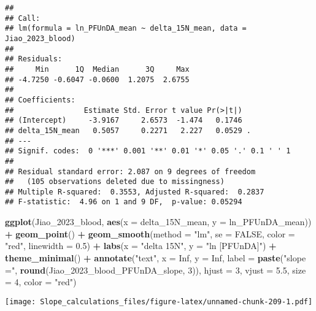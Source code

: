 \documentclass[
]{article}
\newenvironment{Shaded}{\begin{snugshade}}{\end{snugshade}}
\newcommand{\AttributeTok}[1]{\textcolor[rgb]{0.13,0.29,0.53}{#1}}
\newcommand{\ConstantTok}[1]{\textcolor[rgb]{0.56,0.35,0.01}{#1}}
\newcommand{\DecValTok}[1]{\textcolor[rgb]{0.00,0.00,0.81}{#1}}
\newcommand{\FloatTok}[1]{\textcolor[rgb]{0.00,0.00,0.81}{#1}}
\newcommand{\FunctionTok}[1]{\textcolor[rgb]{0.13,0.29,0.53}{\textbf{#1}}}
\newcommand{\NormalTok}[1]{#1}
\newcommand{\SpecialCharTok}[1]{\textcolor[rgb]{0.81,0.36,0.00}{\textbf{#1}}}
\newcommand{\StringTok}[1]{\textcolor[rgb]{0.31,0.60,0.02}{#1}}
\begin{document}
\begin{verbatim}
## 
## Call:
## lm(formula = ln_PFUnDA_mean ~ delta_15N_mean, data = Jiao_2023_blood)
## 
## Residuals:
##     Min      1Q  Median      3Q     Max 
## -4.7250 -0.6047 -0.0600  1.2075  2.6755 
## 
## Coefficients:
##                Estimate Std. Error t value Pr(>|t|)  
## (Intercept)     -3.9167     2.6573  -1.474   0.1746  
## delta_15N_mean   0.5057     0.2271   2.227   0.0529 .
## ---
## Signif. codes:  0 '***' 0.001 '**' 0.01 '*' 0.05 '.' 0.1 ' ' 1
## 
## Residual standard error: 2.087 on 9 degrees of freedom
##   (105 observations deleted due to missingness)
## Multiple R-squared:  0.3553, Adjusted R-squared:  0.2837 
## F-statistic:  4.96 on 1 and 9 DF,  p-value: 0.05294
\end{verbatim}

\begin{Shaded}
\begin{Highlighting}[]
\FunctionTok{ggplot}\NormalTok{(Jiao\_2023\_blood, }\FunctionTok{aes}\NormalTok{(}\AttributeTok{x =}\NormalTok{ delta\_15N\_mean, }\AttributeTok{y =}\NormalTok{ ln\_PFUnDA\_mean)) }\SpecialCharTok{+}
  \FunctionTok{geom\_point}\NormalTok{() }\SpecialCharTok{+}
  \FunctionTok{geom\_smooth}\NormalTok{(}\AttributeTok{method =} \StringTok{"lm"}\NormalTok{, }\AttributeTok{se =} \ConstantTok{FALSE}\NormalTok{, }\AttributeTok{color =} \StringTok{"red"}\NormalTok{, }\AttributeTok{linewidth =} \FloatTok{0.5}\NormalTok{) }\SpecialCharTok{+}
  \FunctionTok{labs}\NormalTok{(}\AttributeTok{x =} \StringTok{"delta 15N"}\NormalTok{,}
       \AttributeTok{y =} \StringTok{"ln [PFUnDA]"}\NormalTok{) }\SpecialCharTok{+}
  \FunctionTok{theme\_minimal}\NormalTok{() }\SpecialCharTok{+}
  \FunctionTok{annotate}\NormalTok{(}\StringTok{"text"}\NormalTok{, }\AttributeTok{x =} \ConstantTok{Inf}\NormalTok{, }\AttributeTok{y =} \ConstantTok{Inf}\NormalTok{, }\AttributeTok{label =} \FunctionTok{paste}\NormalTok{(}\StringTok{"slope ="}\NormalTok{, }\FunctionTok{round}\NormalTok{(Jiao\_2023\_blood\_PFUnDA\_slope, }\DecValTok{3}\NormalTok{)), }
           \AttributeTok{hjust =} \DecValTok{3}\NormalTok{, }\AttributeTok{vjust =} \FloatTok{5.5}\NormalTok{, }\AttributeTok{size =} \DecValTok{4}\NormalTok{, }\AttributeTok{color =} \StringTok{"red"}\NormalTok{)}
\end{Highlighting}
\end{Shaded}

\texttt{[image: Slope\_calculations\_files/figure-latex/unnamed-chunk-209-1.pdf]}
\end{document}

